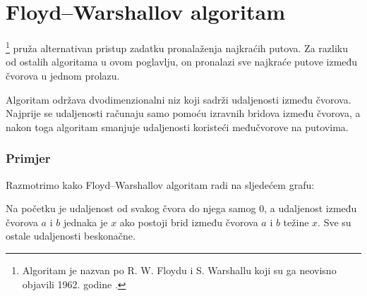 \section{Floyd–Warshallov algoritam}


\footnote{Algoritam je
nazvan po R. W. Floydu i S. Warshallu
koji su ga neovisno objavili 1962. godine \cite{flo62,war62}.}
pruža alternativan pristup zadatku
pronalaženja najkraćih putova.
Za razliku od ostalih algoritama u ovom poglavlju,
on pronalazi sve najkraće putove između čvorova
u jednom prolazu.

Algoritam održava dvodimenzionalni niz
koji sadrži udaljenosti između čvorova.
Najprije se udaljenosti računaju samo pomoću
izravnih bridova između čvorova,
a nakon toga algoritam smanjuje udaljenosti
koristeći međučvorove na putovima.

\subsubsection{Primjer}

Razmotrimo kako Floyd–Warshallov algoritam
radi na sljedećem grafu:

\begin{center}
\end{center}

Na početku je udaljenost od svakog čvora do njega samog $0$,
a udaljenost između čvorova $a$ i $b$ jednaka je $x$
ako postoji brid između čvorova $a$ i $b$ težine $x$.
Sve su ostale udaljenosti beskonačne.

